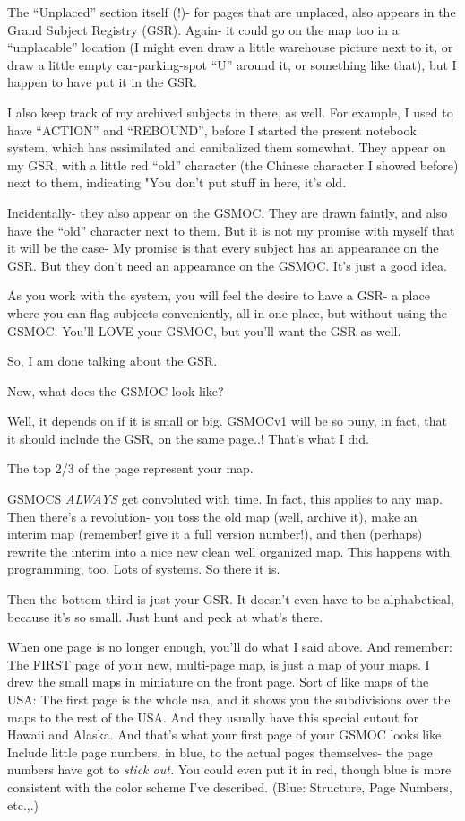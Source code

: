 \documentclass[oneside]{book}
\begin{document}
The ``Unplaced'' section itself (!)- for pages that are unplaced, also
appears in the Grand Subject Registry (GSR). Again- it could go on the
map too in a ``unplacable'' location (I might even draw a little
warehouse picture next to it, or draw a little empty car-parking-spot
``U'' around it, or something like that), but I happen to have put it in
the GSR.

I also keep track of my archived subjects in there, as well. For
example, I used to have ``ACTION'' and ``REBOUND'', before I started the
present notebook system, which has assimilated and canibalized them
somewhat. They appear on my GSR, with a little red ``old'' character
(the Chinese character I showed before) next to them, indicating "You
don't put stuff in here, it's old.

Incidentally- they also appear on the GSMOC. They are drawn faintly,
and also have the ``old'' character next to them. But it is not my
promise with myself that it will be the case- My promise is that every
subject has an appearance on the GSR. But they don't need an
appearance on the GSMOC. It's just a good idea.

As you work with the system, you will feel the desire to have a GSR- a
place where you can flag subjects conveniently, all in one place, but
without using the GSMOC. You'll LOVE your GSMOC, but you'll want the
GSR as well.

So, I am done talking about the GSR.

Now, what does the GSMOC look like?

Well, it depends on if it is small or big. GSMOCv1 will be so puny, in
fact, that it should include the GSR, on the same page..! That's what
I did.

The top 2/3 of the page represent your map.

GSMOCS \emph{ALWAYS} get convoluted with time. In fact, this applies to any
map. Then there's a revolution- you toss the old map (well, archive
it), make an interim map (remember! give it a full version number!),
and then (perhaps) rewrite the interim into a nice new clean well
organized map. This happens with programming, too. Lots of systems. So
there it is.

Then the bottom third is just your GSR. It doesn't even have to be
alphabetical, because it's so small. Just hunt and peck at what's
there.

When one page is no longer enough, you'll do what I said above. And
remember: The FIRST page of your new, multi-page map, is just a map of
your maps. I drew the small maps in miniature on the front page. Sort
of like maps of the USA: The first page is the whole usa, and it shows
you the subdivisions over the maps to the rest of the USA. And they
usually have this special cutout for Hawaii and Alaska. And that's
what your first page of your GSMOC looks like. Include little page
numbers, in blue, to the actual pages themselves- the page numbers
have got to \emph{stick out.} You could even put it in red, though blue is
more consistent with the color scheme I've described. (Blue:
Structure, Page Numbers, etc.,.)
\end{document}
